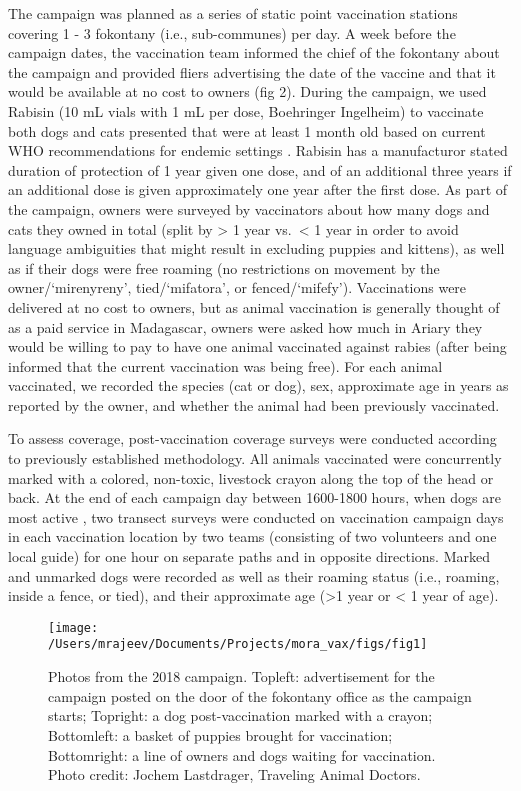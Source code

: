 \documentclass[tropicalmed,article,submit,moreauthors,pdftex]{mdpi}
\begin{document}
The campaign was planned as a series of static point vaccination
stations covering 1 - 3 fokontany (i.e., sub-communes) per day. A week
before the campaign dates, the vaccination team informed the chief of
the fokontany about the campaign and provided fliers advertising the
date of the vaccine and that it would be available at no cost to owners
(fig 2). During the campaign, we used Rabisin (10 mL vials with 1 mL per
dose, Boehringer Ingelheim) to vaccinate both dogs and cats presented
that were at least 1 month old based on current WHO recommendations for
endemic settings \citep{morters2015, world2018expert}. Rabisin has a
manufacturor stated duration of protection of 1 year given one dose, and
of an additional three years if an additional dose is given
approximately one year after the first dose. As part of the campaign,
owners were surveyed by vaccinators about how many dogs and cats they
owned in total (split by \textgreater{} 1 year vs.~\textless{} 1 year in
order to avoid language ambiguities that might result in excluding
puppies and kittens), as well as if their dogs were free roaming (no
restrictions on movement by the owner/`mirenyreny', tied/`mifatora', or
fenced/`mifefy'). Vaccinations were delivered at no cost to owners, but
as animal vaccination is generally thought of as a paid service in
Madagascar, owners were asked how much in Ariary they would be willing
to pay to have one animal vaccinated against rabies (after being
informed that the current vaccination was being free). For each animal
vaccinated, we recorded the species (cat or dog), sex, approximate age
in years as reported by the owner, and whether the animal had been
previously vaccinated.

To assess coverage, post-vaccination coverage surveys were conducted
according to previously established
methodology\citep{sambo2017, gibson2015}. All animals vaccinated were
concurrently marked with a colored, non-toxic, livestock crayon along
the top of the head or back. At the end of each campaign day between
1600-1800 hours, when dogs are most active \citep{sambo2017}, two
transect surveys were conducted on vaccination campaign days in each
vaccination location by two teams (consisting of two volunteers and one
local guide) for one hour on separate paths and in opposite directions.
Marked and unmarked dogs were recorded as well as their roaming status
(i.e., roaming, inside a fence, or tied), and their approximate age
(\textgreater1 year or \textless{} 1 year of age).

\begin{figure}
\texttt{[image: /Users/mrajeev/Documents/Projects/mora\_vax/figs/fig1]} \caption{Photos from the 2018 campaign. Topleft: advertisement for the campaign posted on the door of the fokontany office as the campaign starts; Topright: a dog post-vaccination marked with a crayon; Bottomleft: a basket of puppies brought for vaccination; Bottomright: a line of owners and dogs waiting for vaccination. Photo credit: Jochem Lastdrager, Traveling Animal Doctors.}\label{fig:fig1}
\end{figure}
\end{document}

